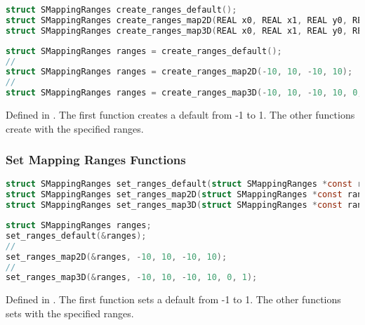 \begin{lstlisting}[caption={Definition of create ranges functions},label={lst:create_ranges_definition},language=OpenCL]
struct SMappingRanges create_ranges_default();
struct SMappingRanges create_ranges_map2D(REAL x0, REAL x1, REAL y0, REAL y1);
struct SMappingRanges create_ranges_map3D(REAL x0, REAL x1, REAL y0, REAL y1, REAL z0, REAL z1)
\end{lstlisting}

\begin{lstlisting}[caption={Example for create ranges functions},label={lst:create_ranges_example},language=OpenCL]
struct SMappingRanges ranges = create_ranges_default();
//
struct SMappingRanges ranges = create_ranges_map2D(-10, 10, -10, 10);
//
struct SMappingRanges ranges = create_ranges_map3D(-10, 10, -10, 10, 0, 1);
\end{lstlisting}

Defined in .
The first function creates a default  from -1 to 1.
The other functions create  with the specified ranges.

\subsubsection{Set Mapping Ranges Functions}

\begin{lstlisting}[caption={Definition of set ranges functions},label={lst:set_ranges_definition},language=OpenCL]
struct SMappingRanges set_ranges_default(struct SMappingRanges *const ranges);
struct SMappingRanges set_ranges_map2D(struct SMappingRanges *const ranges, REAL x0, REAL x1, REAL y0, REAL y1);
struct SMappingRanges set_ranges_map3D(struct SMappingRanges *const ranges, REAL x0, REAL x1, REAL y0, REAL y1, REAL z0, REAL z1);
\end{lstlisting}

\begin{lstlisting}[caption={Example for set ranges functions},label={lst:set_ranges_example},language=OpenCL]
struct SMappingRanges ranges;
set_ranges_default(&ranges);
//
set_ranges_map2D(&ranges, -10, 10, -10, 10);
//
set_ranges_map3D(&ranges, -10, 10, -10, 10, 0, 1);
\end{lstlisting}

Defined in .
The first function sets a default  from -1 to 1.
The other functions sets  with the specified ranges.

